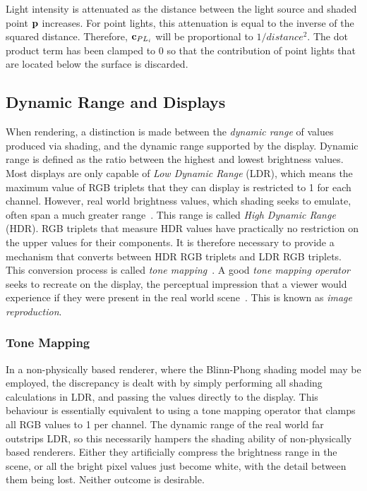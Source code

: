 Light intensity is attenuated as the distance between the light source and shaded point \begin{math}\mathbf{p}\end{math} increases. For point lights, this attenuation is equal to the inverse of the squared distance. Therefore, \begin{math}\mathbf{c}_{PL_i}\end{math} will be proportional to \begin{math}1 / distance^2\end{math}. The dot product term has been clamped to 0 so that the contribution of point lights that are located below the surface is discarded.

\subsection{Dynamic Range and Displays} \label{DynamicRangeAndDisplays}

When rendering, a distinction is made between the \textit{dynamic range} of values produced via shading, and the dynamic range supported by the display. Dynamic range is defined as the ratio between the highest and lowest brightness values. Most displays are only capable of \textit{Low Dynamic Range} (LDR), which means the maximum value of RGB triplets that they can display is restricted to 1 for each channel. However, real world brightness values, which shading seeks to emulate, often span a much greater range~\cite{Reinhard}. This range is called \textit{High Dynamic Range} (HDR). RGB triplets that measure HDR values have practically no restriction on the upper values for their components. It is therefore necessary to provide a mechanism that converts between HDR RGB triplets and LDR RGB triplets. This conversion process is called \textit{tone mapping}~\cite{HoffmanKeynoteEchoChamber}. A good \textit{tone mapping operator} seeks to recreate on the display, the perceptual impression that a viewer would experience if they were present in the real world scene~\cite{HoffmanKeynoteEchoChamber}. This is known as \textit{image reproduction}.

\subsubsection{Tone Mapping}

In a non-physically based renderer, where the Blinn-Phong shading model may be employed, the discrepancy is dealt with by simply performing all shading calculations in LDR, and passing the values directly to the display. This behaviour is essentially equivalent to using a tone mapping operator that clamps all RGB values to 1 per channel. The dynamic range of the real world far outstrips LDR, so this necessarily hampers the shading ability of non-physically based renderers. Either they artificially compress the brightness range in the scene, or all the bright pixel values just become white, with the detail between them being lost. Neither outcome is desirable.

